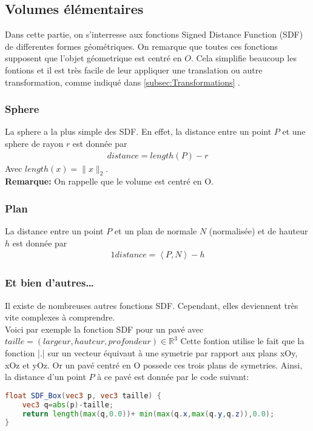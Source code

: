 \subsection{Volumes élémentaires}
Dans cette partie, on s'interresse aux fonctions Signed Distance Function (SDF) de differentes formes géométriques. On remarque que toutes ces fonctions supposent que l'objet géometrique est centré en $O$. Cela simplifie beaucoup les fontions et il est très facile de leur appliquer une translation ou autre transformation, comme indiqué dans \ref{subsec:Transformations} .
\subsubsection{Sphere}
La sphere a la plus simple des SDF. En effet, la distance entre un point $P$ et une sphere de rayon $r$ est donnée par 
\begin{align*}
distance=length(P)-r
\end{align*}
Avec $length(x)=\|x\|_2$.
\\\textbf{Remarque:} On rappelle que le volume est centré en O.
\subsubsection{Plan}
La distance entre un point $P$ et un plan de normale $N$ (normalisée) et de hauteur $h$ est donnée par 
\begin{alignat*}{1}
    distance=\left\langle P,N \right\rangle - h
\end{alignat*}
\subsubsection{Et bien d'autres\ldots}
Il existe de nombreuses autres fonctions SDF. Cependant, elles deviennent très vite complexes à comprendre.\\
Voici par exemple la fonction SDF pour un pavé avec $taille=(largeur, hauteur, profondeur) \in \mathbb{R}^3$
Cette fontion utilise le fait que la fonction |.| sur un vecteur équivaut à une symetrie par rapport aux plans xOy, xOz et yOz. Or un pavé centré en O possede ces trois plans de symetries. Ainsi, la distance d'un point $P$ à ce pavé est donnée par le code suivant:

\begin{lstlisting}[language=GLSL]
float SDF_Box(vec3 p, vec3 taille) {
	vec3 q=abs(p)-taille;
	return length(max(q,0.0))+ min(max(q.x,max(q.y,q.z)),0.0);
}
\end{lstlisting}